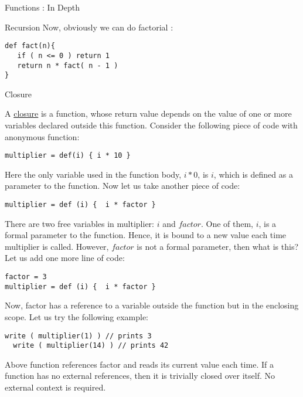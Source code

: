 \begin{section}{Functions : In Depth}
\begin{subsection}{Recursion}
Now, obviously we can do factorial :
\begin{lstlisting}[style=JexlStyle]
def fact(n){
   if ( n <= 0 ) return 1 
   return n * fact( n - 1 )
}
\end{lstlisting}

\end{subsection}

\begin{subsection}{Closure}

A \href{https://en.wikipedia.org/wiki/Closure_(computer_programming)}{closure} 
is a function, whose return value depends on the value of one or more variables declared outside this function. 
Consider the following piece of code with anonymous function:

\begin{lstlisting}[style=JexlStyle]
multiplier = def(i) { i * 10 }
\end{lstlisting}

Here the only variable used in the function body, $i * 0$, is $i$, which is defined as a parameter to the function. 
Now let us take another piece of code:

\begin{lstlisting}[style=JexlStyle]
multiplier = def (i) {  i * factor } 
\end{lstlisting}

There are two free variables in multiplier: $i$ and $factor$. One of them, $i$, is a formal parameter to the function. 
Hence, it is bound to a new value each time multiplier is called. 
However, $factor$ is not a formal parameter, then what is this? 
Let us add one more line of code:

\begin{lstlisting}[style=JexlStyle]
factor = 3
multiplier = def (i) {  i * factor } 
\end{lstlisting}

Now, factor has a reference to a variable outside the function but in the enclosing scope. Let us try the following example:

\begin{lstlisting}[style=JexlStyle]
  write ( multiplier(1) ) // prints 3 
  write ( multiplier(14) ) // prints 42 
\end{lstlisting}
  
Above function references factor and reads its current value each time. 
If a function has no external references, then it is trivially closed over itself. No external context is required.


\end{subsection}
\end{section}
